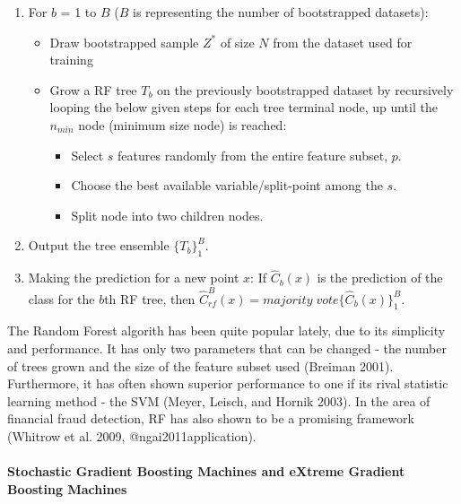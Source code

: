 \documentclass[12pt,]{article}
\providecommand{\tightlist}{%
  \setlength{\itemsep}{0pt}\setlength{\parskip}{0pt}}
\let\oldparagraph\paragraph
\renewcommand{\paragraph}[1]{\oldparagraph{#1}\mbox{}}
\begin{document}
\begin{enumerate}
\def\labelenumi{\arabic{enumi}.}
\tightlist
\item
  For \(b\) = 1 to \(B\) (\(B\) is representing the number of
  bootstrapped datasets):

  \begin{itemize}
  \tightlist
  \item
    Draw bootstrapped sample \(Z^*\) of size \(N\) from the dataset used
    for training
  \item
    Grow a RF tree \(T_b\) on the previously bootstrapped dataset by
    recursively looping the below given steps for each tree terminal
    node, up until the \(n_{min}\) node (minimum size node) is reached:

    \begin{itemize}
    \tightlist
    \item
      Select \(s\) features randomly from the entire feature subset,
      \(p\).
    \item
      Choose the best available variable/split-point among the \(s\).
    \item
      Split node into two children nodes.
    \end{itemize}
  \end{itemize}
\item
  Output the tree ensemble \(\{T_b\}^{B}_{1}\).
\item
  Making the prediction for a new point \(x\): If \(\widehat{C}_b(x)\)
  is the prediction of the class for the \(b\)th RF tree, then
  \(\widehat{C}_{rf}^{B}(x)=majority\;vote\{\widehat{C}_b(x)\}_{1}^{B}\).
\end{enumerate}

The Random Forest algorith has been quite popular lately, due to its
simplicity and performance. It has only two parameters that can be
changed - the number of trees grown and the size of the feature subset
used (Breiman 2001). Furthermore, it has often shown superior
performance to one if its rival statistic learning method - the SVM
(Meyer, Leisch, and Hornik 2003). In the area of financial fraud
detection, RF has also shown to be a promising framework (Whitrow et al.
2009, @ngai2011application).

\hypertarget{stochastic-gradient-boosting-machines-and-extreme-gradient-boosting-machines}{%
\paragraph{Stochastic Gradient Boosting Machines and eXtreme Gradient
Boosting
Machines}\label{stochastic-gradient-boosting-machines-and-extreme-gradient-boosting-machines}}
\end{document}
